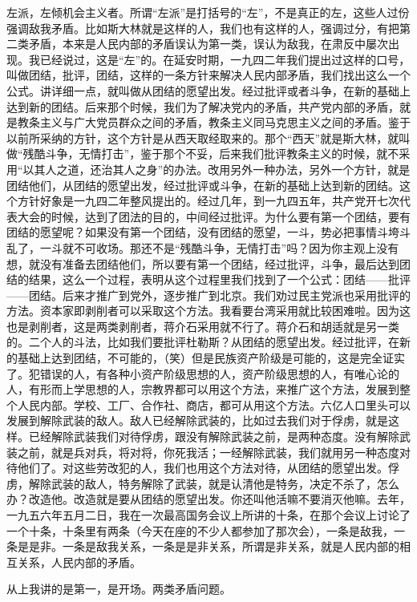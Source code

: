 左派，左倾机会主义者。所谓“左派”是打括号的“左”，不是真正的左，这些人过份强调敌我矛盾。比如斯大林就是这样的人，我们也有这样的人，强调过分，有把第二类矛盾，本来是人民内部的矛盾误认为第一类，误认为敌我，在肃反中屡次出现。我已经说过，这是“左”的。在延安时期，一九四二年我们提出过这样的口号，叫做团结，批评，团结，这样的一条方针来解决人民内部矛盾，我们找出这么一个公式。讲详细一点，就叫做从团结的愿望出发。经过批评或者斗争，在新的基础上达到新的团结。后来那个时候，我们为了解决党内的矛盾，共产党内部的矛盾，就是教条主义与广大党员群众之间的矛盾，教条主义同马克思主义之间的矛盾。鉴于以前所采纳的方针，这个方针是从西天取经取来的。那个“西天”就是斯大林，就叫做“残酷斗争，无情打击”，鉴于那个不妥，后来我们批评教条主义的时候，就不采用“以其人之道，还治其人之身”的办法。改用另外一种办法，另外一个方针，就是团结他们，从团结的愿望出发，经过批评或斗争，在新的基础上达到新的团结。这个方针好象是一九四二年整风提出的。经过几年，到一九四五年，共产党开七次代表大会的时候，达到了团法的目的，中间经过批评。为什么要有第一个团结，要有团结的愿望呢？如果没有第一个团结，没有团结的愿望，一斗，势必把事情斗垮斗乱了，一斗就不可收场。那还不是“残酷斗争，无情打击”吗？因为你主观上没有想，就没有准备去团结他们，所以要有第一个团结，经过批评，斗争，最后达到团结的结果，这么一个过程，表明从这个过程里我们找到了一个公式：团结——批评——团结。后来才推广到党外，逐步推广到北京。我们劝过民主党派也采用批评的方法。资本家即剥削者可以采取这个方法。我看要台湾采用就比较困难啦。因为这也是剥削者，这是两类剥削者，蒋介石采用就不行了。蒋介石和胡适就是另一类的。二个人的斗法，比如我们要批评杜勒斯？从团结的愿望出发。经过批评，在新的基础上达到团结，不可能的，（笑）但是民族资产阶级是可能的，这是完全证实了。犯错误的人，有各种小资产阶级思想的人，资产阶级思想的人，有唯心论的人，有形而上学思想的人，宗教界都可以用这个方法，来推广这个方法，发展到整个人民内部。学校、工厂、合作社、商店，都可从用这个方法。六亿人口里头可以发展到解除武装的敌人。敌人已经解除武装的，比如过去我们对于俘虏，就是这样。已经解除武装我们对待俘虏，跟没有解除武装之前，是两种态度。没有解除武装之前，就是兵对兵，将对将，你死我活；一经解除武装，我们就用另一种态度对待他们了。对这些劳改犯的人，我们也用这个方法对待，从团结的愿望出发。俘虏，解除武装的敌人，特务解除了武装，就是认清他是特务，决定不杀了，怎么办？改造他。改造就是要从团结的愿望出发。你还叫他活嘛不要消灭他嘛。去年，一九五六年五月二日，我在一次最高国务会议上所讲的十条，在那个会议上讨论了一个十条，十条里有两条（今天在座的不少人都参加了那次会），一条是敌我，一条是是非。一条是敌我关系，一条是是非关系，所谓是非关系，就是人民内部的相互关系，人民内部的矛盾。

从上我讲的是第一，是开场。两类矛盾问题。

